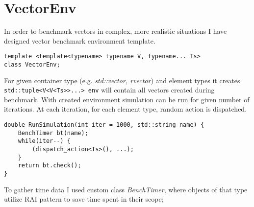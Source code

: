 \documentclass[inz, english, shortabstract]{iithesis}
\begin{document}
\section{VectorEnv}
In order to benchmark vectors in complex, more realistic situations I have designed vector benchmark environment template.

\begin{lstlisting}[caption=VectorEnv declaration]
template <template<typename> typename V, typename... Ts>
class VectorEnv;
\end{lstlisting}
For given container type (e.g. {\it std::vector, rvector}) and element types it creates 
\lstinline{std::tuple<V<V<Ts>>...> env}
will contain all vectors created during benchmark. 
With created environment simulation can be run for given number of iterations.
At each iteration, for each element type, random action is dispatched.
\begin{lstlisting}[caption=RunSimulation]
double RunSimulation(int iter = 1000, std::string name) {
	BenchTimer bt(name);
	while(iter--) {
		(dispatch_action<Ts>(), ...);
	}
	return bt.check();
}
\end{lstlisting}
To gather time data I used custom class {\it BenchTimer}, where objects of that type utilize RAI pattern to save time spent in their scope;

\clearpage
\end{document}
